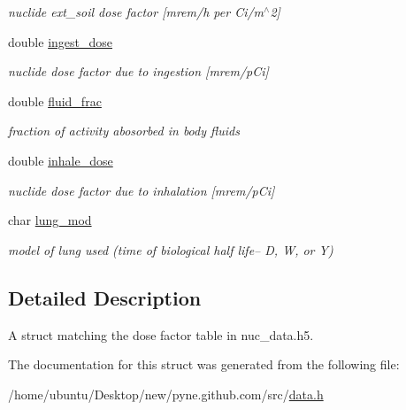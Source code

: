 \begin{DoxyCompactItemize}
\begin{DoxyCompactList}\small\item\em nuclide ext\+\_\+soil dose factor \mbox{[}mrem/h per Ci/m$^\wedge$2\mbox{]} \end{DoxyCompactList}\item 
double \hyperlink{structpyne_1_1dose_a96dc0ff17888672afb40c82b3c6bb996}{ingest\+\_\+dose}\hypertarget{structpyne_1_1dose_a96dc0ff17888672afb40c82b3c6bb996}{}\label{structpyne_1_1dose_a96dc0ff17888672afb40c82b3c6bb996}

\begin{DoxyCompactList}\small\item\em nuclide dose factor due to ingestion \mbox{[}mrem/p\+Ci\mbox{]} \end{DoxyCompactList}\item 
double \hyperlink{structpyne_1_1dose_ac5aad706f373cee64e286f6191f753c2}{fluid\+\_\+frac}\hypertarget{structpyne_1_1dose_ac5aad706f373cee64e286f6191f753c2}{}\label{structpyne_1_1dose_ac5aad706f373cee64e286f6191f753c2}

\begin{DoxyCompactList}\small\item\em fraction of activity abosorbed in body fluids \end{DoxyCompactList}\item 
double \hyperlink{structpyne_1_1dose_ade66b3422bf24883142e0de856d67228}{inhale\+\_\+dose}\hypertarget{structpyne_1_1dose_ade66b3422bf24883142e0de856d67228}{}\label{structpyne_1_1dose_ade66b3422bf24883142e0de856d67228}

\begin{DoxyCompactList}\small\item\em nuclide dose factor due to inhalation \mbox{[}mrem/p\+Ci\mbox{]} \end{DoxyCompactList}\item 
char \hyperlink{structpyne_1_1dose_afc70c9461a6c1e3348a90e66747db41e}{lung\+\_\+mod}\hypertarget{structpyne_1_1dose_afc70c9461a6c1e3348a90e66747db41e}{}\label{structpyne_1_1dose_afc70c9461a6c1e3348a90e66747db41e}

\begin{DoxyCompactList}\small\item\em model of lung used (time of biological half life-- D, W, or Y) \end{DoxyCompactList}\end{DoxyCompactItemize}


\subsection{Detailed Description}
A struct matching the dose factor table in nuc\+\_\+data.\+h5. 

The documentation for this struct was generated from the following file\+:\begin{DoxyCompactItemize}
\item 
/home/ubuntu/\+Desktop/new/pyne.\+github.\+com/src/\hyperlink{data_8h}{data.\+h}\end{DoxyCompactItemize}
